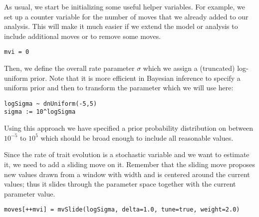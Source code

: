 
As usual, we start be initializing some useful helper variables.
For example, we set up a counter variable for the number of moves that we already added to our analysis.
This will make it much easier if we extend the model or analysis to include additional moves or to remove some moves.
{\tt \begin{snugshade*}
\begin{lstlisting}
mvi = 0 
\end{lstlisting}
\end{snugshade*}}

Then, we define the overall rate parameter $\sigma$ which we assign a (truncated) log-uniform prior. Note that it is more efficient in Bayesian inference to specify a uniform prior and then to transform the parameter which we will use here:
{\tt \small \begin{snugshade*}
\begin{lstlisting}
logSigma ~ dnUniform(-5,5)
sigma := 10^logSigma
\end{lstlisting}
\end{snugshade*}}
Using this approach we have specified a prior probability distribution on  between $10^{-5}$ to $10^5$ which should be broad enough to include all reasonable values.

Since the rate of trait evolution  is a stochastic variable and we want to estimate it, we need to add a sliding move on it. Remember that the sliding move proposes new values drawn from a window with width  and is centered around the current values; thus it slides through the parameter space together with the current parameter value.
{\tt \small \begin{snugshade*}
\begin{lstlisting}
moves[++mvi] = mvSlide(logSigma, delta=1.0, tune=true, weight=2.0)
\end{lstlisting}
\end{snugshade*}}

